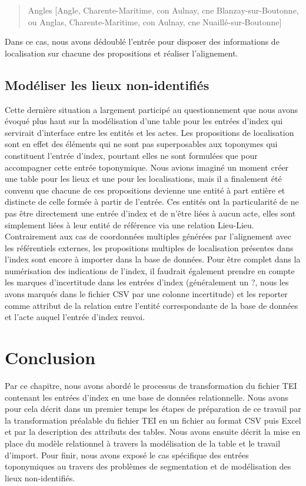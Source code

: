 \documentclass[a4paper,12pt,twoside]{book}
\begin{document}
	\begin{quotation}
		Angles [Angle, Charente-Maritime, con Aulnay, cne Blanzay-sur-Boutonne, ou Anglas, Charente-Maritime, con Aulnay, cne Nuaillé-sur-Boutonne]
	\end{quotation}
	
	\noindent Dans ce cas, nous avons dédoublé l'entrée pour disposer des informations de localisation sur chacune des propositions et réaliser l'alignement.
	
	\subsection{Modéliser les lieux non-identifiés}
	
	Cette dernière situation a largement participé au questionnement que nous avons évoqué plus haut sur la modélisation d'une table pour les entrées d'index qui servirait d'interface entre les entités et les actes. Les propositions de localisation sont en effet des éléments qui ne sont pas superposables aux toponymes qui constituent l'entrée d'index, pourtant elles ne sont formulées que pour accompagner cette entrée toponymique. Nous avions imaginé un moment créer une table pour les lieux et une pour les localisations, mais il a finalement été convenu que chacune de ces propositions devienne une entité à part entière et distincte de celle formée à partir de l'entrée. Ces entités ont la particularité de ne pas être directement une entrée d'index et de n'être liées à aucun acte, elles sont simplement liées à leur entité de référence via une relation Lieu-Lieu. Contrairement aux cas de coordonnées multiples générées par l'alignement avec les référentiels externes, les propositions multiples de localisation présentes dans l'index sont encore à importer dans la base de données. Pour être complet dans la numérisation des indications de l'index, il faudrait également prendre en compte les marques d'incertitude dans les entrées d'index (généralement un \og ?\fg{}, nous les avons marqués dans le fichier CSV par une colonne \og incertitude\fg{}) et les reporter comme attribut de la relation entre l'entité correspondante de la base de données et l'acte auquel l'entrée d'index renvoi.
	
	\section*{Conclusion}
	
	Par ce chapitre, nous avons abordé le processus de transformation du fichier TEI contenant les entrées d'index en une base de données relationnelle. Nous avons pour cela décrit dans un premier temps les étapes de préparation de ce travail par la transformation préalable du fichier TEI en un fichier au format CSV puis Excel et par la description des attributs des tables. Nous avons ensuite décrit la mise en place du modèle relationnel à travers la modélisation de la table et le travail d'import. Pour finir, nous avons exposé le cas spécifique des entrées toponymiques au travers des problèmes de segmentation et de modélisation des lieux non-identifiés.
	
\end{document}
